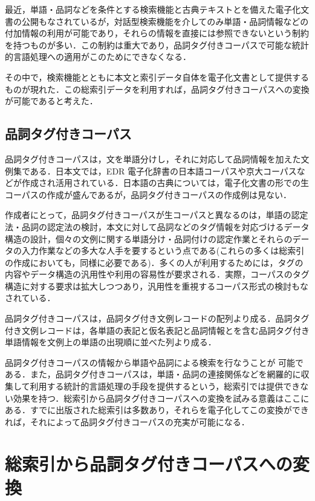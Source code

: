 最近，単語・品詞などを条件とする検索機能と古典テキストとを備えた電子化文書の公開もなされているが，対話型検索機能を介してのみ単語・品詞情報などの付加情報の利用が可能であり，それらの情報を直接には参照できないという制約を持つものが多い．この制約は重大であり，品詞タグ付きコーパスで可能な統計的言語処理への適用がこのためにできなくなる．

その中で，検索機能とともに本文と索引データ自体を電子化文書として提供するものが現れた\cite{UTA1994}\cite{NIKKI1996}．この総索引データを利用すれば，品詞タグ付きコーパスへの変換が可能であると考えた．

\subsection{品詞タグ付きコーパス}
\label{sec:tagged-corpus}

品詞タグ付きコーパスは，文を単語分けし，それに対応して品詞情報を加えた文例集である．日本文では，EDR 電子化辞書\cite{EDR2001}の日本語コーパスや京大コーパス\cite{KyouDai1997}などが作成され活用されている．日本語の古典については，電子化文書の形での生コーパスの作成が盛んであるが，品詞タグ付きコーパスの作成例は見ない．

作成者にとって，品詞タグ付きコーパスが生コーパスと異なるのは，単語の認定法・品詞の認定法の検討，本文に対して品詞などのタグ情報を対応づけるデータ構造の設計，個々の文例に関する単語分け・品詞付けの認定作業とそれらのデータの入力作業などの多大な人手を要するという点である(これらの多くは総索引の作成においても，同様に必要である)．多くの人が利用するためには，タグの内容やデータ構造の汎用性や利用の容易性が要求される．実際，コーパスのタグ構造に対する要求は拡大しつつあり，汎用性を重視するコーパス形式の検討もなされている\cite{Tanaka2000}\cite{Hashida1999}．

品詞タグ付きコーパスは，品詞タグ付き文例レコードの配列より成る．品詞タグ付き文例レコードは，各単語の表記と仮名表記と品詞情報とを含む品詞タグ付き単語情報を文例上の単語の出現順に並べた列より成る．

品詞タグ付きコーパスの情報から単語や品詞による検索を行なうことが
可能である．また，品詞タグ付きコーパスは，単語・品詞の連接関係などを網羅的に収集して利用する統計的言語処理の手段を提供するという，総索引では提供できない効果を持つ．総索引から品詞タグ付きコーパスへの変換を試みる意義はここにある．すでに出版された総索引は多数あり，それらを電子化してこの変換ができれば，それによって品詞タグ付きコーパスの充実が可能になる．


\section{総索引から品詞タグ付きコーパスへの変換}
\label{sec:trans}

